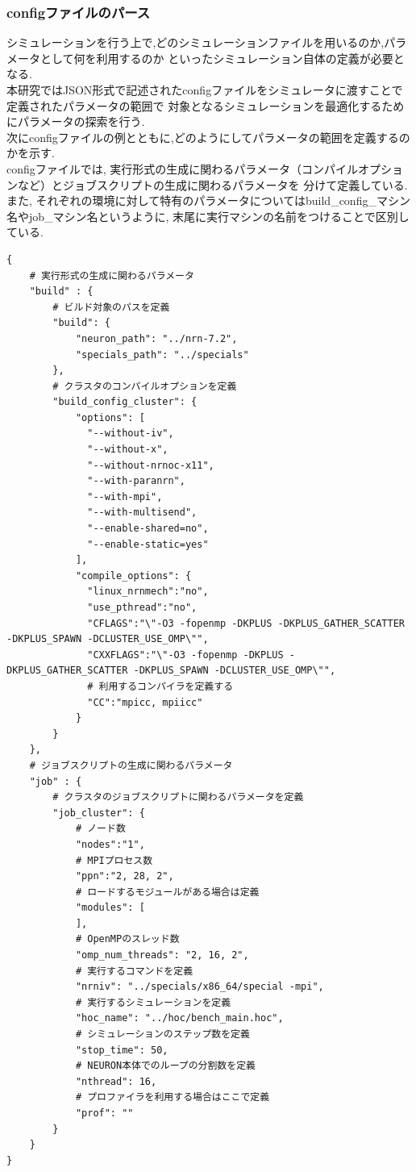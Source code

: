 \subsubsection{configファイルのパース}
\label{sec:simulator-config-parse}
シミュレーションを行う上で,どのシミュレーションファイルを用いるのか,パラメータとして何を利用するのか
といったシミュレーション自体の定義が必要となる.\\
本研究ではJSON形式で記述されたconfigファイルをシミュレータに渡すことで定義されたパラメータの範囲で
対象となるシミュレーションを最適化するためにパラメータの探索を行う.\\
次にconfigファイルの例とともに,どのようにしてパラメータの範囲を定義するのかを示す.\\
configファイルでは, 実行形式の生成に関わるパラメータ（コンパイルオプションなど）とジョブスクリプトの生成に関わるパラメータを
分けて定義している.\\
また, それぞれの環境に対して特有のパラメータについてはbuild\_config\_マシン名やjob\_マシン名というように,
末尾に実行マシンの名前をつけることで区別している.\\
\begin{table}[htb]
  \caption{クラスタに対するconfigファイル}
{\footnotesize
\begin{lstlisting}[frame=single]
{
    # 実行形式の生成に関わるパラメータ
    "build" : {
        # ビルド対象のパスを定義
        "build": {
            "neuron_path": "../nrn-7.2",
            "specials_path": "../specials"
        },
        # クラスタのコンパイルオプションを定義
        "build_config_cluster": {
            "options": [
              "--without-iv",
              "--without-x",
              "--without-nrnoc-x11",
              "--with-paranrn",
              "--with-mpi",
              "--with-multisend",
              "--enable-shared=no",
              "--enable-static=yes"
            ],
            "compile_options": {
              "linux_nrnmech":"no",
              "use_pthread":"no",
              "CFLAGS":"\"-O3 -fopenmp -DKPLUS -DKPLUS_GATHER_SCATTER -DKPLUS_SPAWN -DCLUSTER_USE_OMP\"",
              "CXXFLAGS":"\"-O3 -fopenmp -DKPLUS -DKPLUS_GATHER_SCATTER -DKPLUS_SPAWN -DCLUSTER_USE_OMP\"",
              # 利用するコンパイラを定義する
              "CC":"mpicc, mpiicc"
            }
        }
    },
    # ジョブスクリプトの生成に関わるパラメータ
    "job" : {
        # クラスタのジョブスクリプトに関わるパラメータを定義
        "job_cluster": {
            # ノード数
            "nodes":"1",
            # MPIプロセス数
            "ppn":"2, 28, 2",
            # ロードするモジュールがある場合は定義
            "modules": [
            ],
            # OpenMPのスレッド数
            "omp_num_threads": "2, 16, 2",
            # 実行するコマンドを定義
            "nrniv": "../specials/x86_64/special -mpi",
            # 実行するシミュレーションを定義
            "hoc_name": "../hoc/bench_main.hoc",
            # シミュレーションのステップ数を定義
            "stop_time": 50,
            # NEURON本体でのループの分割数を定義
            "nthread": 16,
            # プロファイラを利用する場合はここで定義
            "prof": ""
        }
    }
}
\end{lstlisting}
}
\end{table}

